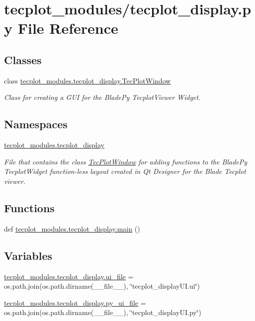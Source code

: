\hypertarget{a00038}{}\section{tecplot\+\_\+modules/tecplot\+\_\+display.py File Reference}
\label{a00038}
\subsection*{Classes}
\begin{DoxyCompactItemize}
\item 
class \hyperlink{a00110}{tecplot\+\_\+modules.\+tecplot\+\_\+display.\+Tec\+Plot\+Window}
\begin{DoxyCompactList}\small\item\em Class for creating a G\+UI for the Blade\+Py Tecplot\+Viewer Widget. \end{DoxyCompactList}\end{DoxyCompactItemize}
\subsection*{Namespaces}
\begin{DoxyCompactItemize}
\item 
 \hyperlink{a00063}{tecplot\+\_\+modules.\+tecplot\+\_\+display}
\begin{DoxyCompactList}\small\item\em File that contains the class \hyperlink{a00110}{Tec\+Plot\+Window} for adding functions to the Blade\+Py Tecplot\+Widget function-\/less layout created in Qt Designer for the Blade Tecplot viewer. \end{DoxyCompactList}\end{DoxyCompactItemize}
\subsection*{Functions}
\begin{DoxyCompactItemize}
\item 
def \hyperlink{a00063_ae84aaefe646aaa295bfdc9a3046a660f}{tecplot\+\_\+modules.\+tecplot\+\_\+display.\+main} ()
\end{DoxyCompactItemize}
\subsection*{Variables}
\begin{DoxyCompactItemize}
\item 
\hyperlink{a00063_a6eb7c910a295eb89ac32ad8b00d5bd2e}{tecplot\+\_\+modules.\+tecplot\+\_\+display.\+ui\+\_\+file} = os.\+path.\+join(os.\+path.\+dirname(\+\_\+\+\_\+file\+\_\+\+\_\+), \char`\"{}tecplot\+\_\+display\+U\+I.\+ui\char`\"{})
\item 
\hyperlink{a00063_a4ac8bfff686ecfec8b20653a09a9acc3}{tecplot\+\_\+modules.\+tecplot\+\_\+display.\+py\+\_\+ui\+\_\+file} = os.\+path.\+join(os.\+path.\+dirname(\+\_\+\+\_\+file\+\_\+\+\_\+), \char`\"{}tecplot\+\_\+display\+U\+I.\+py\char`\"{})
\end{DoxyCompactItemize}

